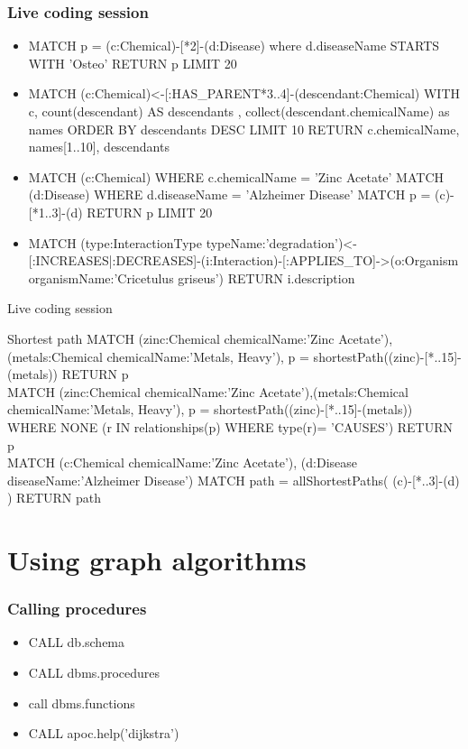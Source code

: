 \documentclass[12pt]{beamer}
\begin{document}
    \begin{frame}
        \frametitle{Live coding session}
        \begin{itemize}
            \item MATCH p = (c:Chemical)-[*2]-(d:Disease) where d.diseaseName STARTS WITH 'Osteo' RETURN p LIMIT 20
            \item MATCH (c:Chemical)<-[:HAS\_PARENT*3..4]-(descendant:Chemical) 
            WITH c, count(descendant) AS descendants , collect(descendant.chemicalName) as names ORDER BY descendants DESC LIMIT 10
            RETURN c.chemicalName, names[1..10], descendants
            \item MATCH (c:Chemical) WHERE c.chemicalName = 'Zinc Acetate'
            MATCH (d:Disease) WHERE d.diseaseName = 'Alzheimer Disease' 
            MATCH p = (c)-[*1..3]-(d)
            RETURN p LIMIT 20
            \item
            MATCH (type:InteractionType {typeName:'degradation'})<-[:INCREASES|:DECREASES]-(i:Interaction)-[:APPLIES\_TO]->(o:Organism {organismName:'Cricetulus griseus'}) RETURN i.description
        \end{itemize}
    \end{frame}
    
    \begin{frame}{Live coding session}
        \begin{block}{Shortest path}
            MATCH (zinc:Chemical {chemicalName:'Zinc Acetate'}),(metals:Chemical {chemicalName:'Metals, Heavy'}), p = shortestPath((zinc)-[*..15]-(metals))
            RETURN p\\
            
            MATCH (zinc:Chemical {chemicalName:'Zinc Acetate'}),(metals:Chemical {chemicalName:'Metals, Heavy'}), p = shortestPath((zinc)-[*..15]-(metals)) 
            WHERE NONE (r IN relationships(p) WHERE type(r)= 'CAUSES')
            RETURN p\\
            
            MATCH (c:Chemical {chemicalName:'Zinc Acetate'}), (d:Disease {diseaseName:'Alzheimer Disease'})
            MATCH path = allShortestPaths( (c)-[*..3]-(d) )
            RETURN path
        \end{block}
    \end{frame}
    
    \section{Using graph algorithms}
    \begin{frame}
        \frametitle{Calling procedures}
        \begin{itemize}
            \item CALL db.schema
            \item CALL dbms.procedures
            \item call dbms.functions
            \item CALL apoc.help('dijkstra')
        \end{itemize}
    \end{frame}
    
\end{document}
